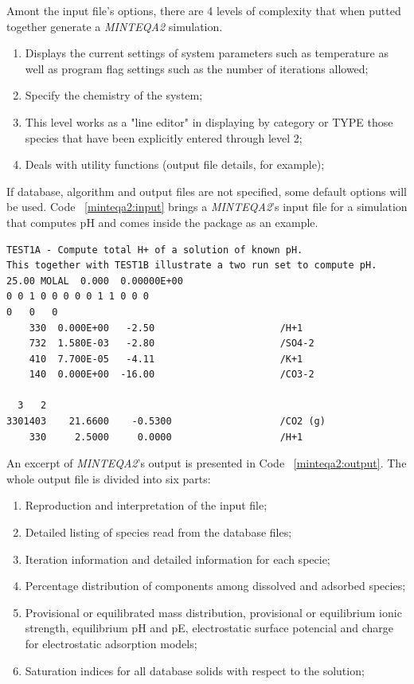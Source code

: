 \documentclass[ppgc,mestrado,English]{iiufrgs}
\begin{document}
Amont the input file's options, there are 4 levels of complexity that when putted together generate a \emph{MINTEQA2} simulation. 
\begin{enumerate}
\item Displays the current settings of system parameters such as temperature as well as program flag settings such as the number of iterations allowed;
\item Specify the chemistry of the system;
\item This level works as a "line editor" in displaying by category or TYPE those species that have been explicitly entered through level 2;
\item Deals with utility functions (output file details, for example);
\end{enumerate}

If database, algorithm and output files are not specified, some default options will be used. Code ~\ref{minteqa2:input} brings a \emph{MINTEQA2}'s input file for a simulation that computes pH and comes inside the package as an example.

\begin{minipage}[c]{0.93\textwidth}
\begin{lstlisting}[frame=single, caption=\emph{MINTEQA2}'s input file, label=minteqa2:input]
TEST1A - Compute total H+ of a solution of known pH.              
This together with TEST1B illustrate a two run set to compute pH. 
25.00 MOLAL  0.000  0.00000E+00
0 0 1 0 0 0 0 0 1 1 0 0 0
0   0   0
    330  0.000E+00   -2.50                      /H+1               
    732  1.580E-03   -2.80                      /SO4-2             
    410  7.700E-05   -4.11                      /K+1               
    140  0.000E+00  -16.00                      /CO3-2             
  
  3   2
3301403    21.6600    -0.5300                   /CO2 (g)           
    330     2.5000     0.0000                   /H+1  
\end{lstlisting}
\end{minipage}

An excerpt of \emph{MINTEQA2}'s output is presented in Code ~\ref{minteqa2:output}. The whole output file is divided into six parts:
\begin{enumerate}
\item Reproduction and interpretation of the input file;
\item Detailed listing of species read from the database files;
\item Iteration information and detailed information for each specie;
\item Percentage distribution of components among dissolved and adsorbed species;
\item Provisional or equilibrated mass distribution, provisional or equilibrium ionic strength, equilibrium pH and pE, electrostatic surface potencial and charge for electrostatic adsorption models;
\item Saturation indices for all database solids with respect to the solution;
\end{enumerate}
\end{document}
